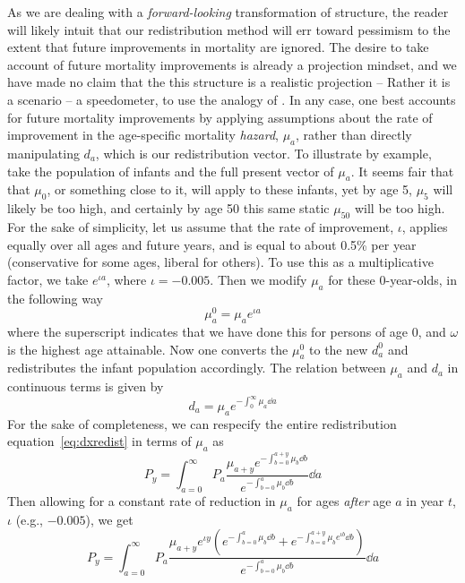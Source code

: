 \FloatBarrier
\label{sec:eximprov}
As we are dealing with a \textit{forward-looking} \citep{sanderson2007new}
transformation of structure, the reader will likely intuit that our redistribution 
method will err toward pessimism to the extent that
future improvements in mortality are ignored. The desire to take account of
future mortality improvements is already a projection mindset, and we have made
no claim that the this structure is a realistic projection -- Rather it is a
scenario -- a speedometer, to use the analogy of \citet{coale1972growth}. In any
case, one best accounts for future mortality improvements by applying assumptions about the rate of
improvement in the age-specific mortality \textit{hazard}, $\mu_a$, rather than
directly manipulating $d_a$, which is our redistribution vector. To illustrate by
example, take the population of infants and the full present vector of $\mu_a$. It seems fair that
that $\mu_0$, or something close to it, will apply to these infants, yet by age
5, $\mu_5$ will likely be too high, and certainly by age 50
this same static $\mu_50$ will be too high. For the sake of simplicity, let us assume that the
rate of improvement, $\iota$, applies equally over all ages and future years,
and is equal to about 0.5\% per year (conservative for some ages, liberal
for others). To use this as a multiplicative factor, we take $e^{\iota a}$,
where $\iota = -0.005$. Then we modify $\mu_a$ for these 0-year-olds, in the
following way
\begin{equation}
\mu_a^0 = \mu_a e^{\iota a} 
\end{equation}
where the superscript indicates that we have done this for persons of age 0, and
$\omega$ is the highest age attainable. Now one converts the $\mu _a^0$ to the
new $d_a^0$ and redistributes the infant population accordingly. The relation
between $\mu_a$ and $d_a$ in continuous terms is given by
\begin{equation}
d_a = \mu_a e^{-\int_0^\infty \mu_a \dd a}
\end{equation}
For the sake of completeness, we can respecify the entire redistribution
equation~\eqref{eq:dxredist} in terms of $\mu_a$ as
\begin{equation}
P_y = \int _{a=0}^\infty P_a \frac{\mu_{a+y} e^{-\int_{b=0}^{a+y} \mu_b \dd
b}}{e^{-\int_{b=0}^a \mu_b \dd b}} \dd a
\end{equation}
Then allowing for a constant rate of reduction in $\mu_a$ for ages
\textit{after} age $a$ in year $t$, $\iota$ (e.g., $-0.005$), we get
\begin{equation}
P_y = \int_{a=0}^\infty P_a \frac{\mu_{a+y}e^{\iota y} (e^{-\int_{b=0}^a\mu_b
\dd b}+e^{-\int_{b=a}^{a+y} \mu_b e^{\iota b} \dd b})}{e^{-\int_{b=0}^a \mu_b
\dd b}} \dd a
\end{equation}
